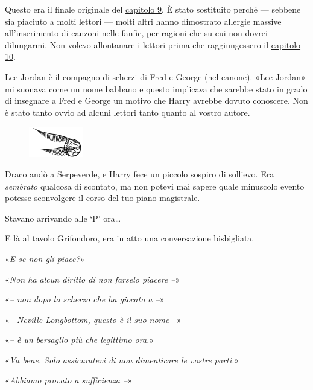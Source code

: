 \vspace{1em}
\begin{addmargin}[3em]{3em}%
\begin{itpars}
Questo era il finale originale del \hyperref[capitolo:9]{capitolo 9}. È stato sostituito perché — sebbene sia piaciuto a molti lettori — molti altri hanno dimostrato allergie massive all’inserimento di canzoni nelle fanfic, per ragioni che su cui non dovrei dilungarmi. Non volevo allontanare i lettori prima che raggiungessero il \hyperref[capitolo:10]{capitolo 10}.

Lee Jordan è il compagno di scherzi di Fred e George (nel canone). «Lee Jordan» mi suonava come un nome babbano e questo implicava che sarebbe stato in grado di insegnare a Fred e George un motivo che Harry avrebbe dovuto conoscere. Non è stato tanto ovvio ad alcuni lettori tanto quanto al vostro autore.
\end{itpars}
\end{addmargin}
\vspace{1em}

\begin{figure}[h]
	\includegraphics[scale=0.4]{boccino.png}
	\centering
\end{figure}

Draco andò a Serpeverde, e Harry fece un piccolo sospiro di sollievo. Era \textit{sembrato} qualcosa di scontato, ma non potevi mai sapere quale minuscolo evento potesse sconvolgere il corso del tuo piano magistrale.

Stavano arrivando alle ‘P’ ora…

E là al tavolo Grifondoro, era in atto una conversazione bisbigliata.

«\textit{E se non gli piace?}»

«\textit{Non ha alcun diritto di non farselo piacere –}»

«\textit{– non dopo lo scherzo che ha giocato a –}»

«\textit{– Neville Longbottom, questo è il suo nome –}»

«\textit{– è un bersaglio più che legittimo ora.}»

«\textit{Va bene. Solo assicuratevi di non dimenticare le vostre parti.}»

«\textit{Abbiamo provato a sufficienza –}»

